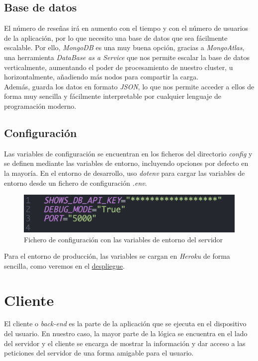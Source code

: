 \subsection{Base de datos}
El número de reseñas irá en aumento con el tiempo y con el número de usuarios de la aplicación, por lo que necesito una
base de datos que sea fácilmente escalable. Por ello, \textit{MongoDB}\cite{mongodb} es una muy buena opción, gracias a
\textit{MongoAtlas}\cite{mongoatlas}, una herramienta \textit{DataBase as a Service}\cite{dbaas} que nos permite escalar
la base de datos verticalmente, aumentando el poder de procesamiento de nuestro cluster, u horizontalmente, añadiendo
más nodos para compartir la carga.\\

Además, guarda los datos en formato \textit{JSON}\cite{json}, lo que nos permite acceder a ellos de forma muy sencilla y
fácilmente interpretable por cualquier lenguaje de programación moderno.

\subsection{Configuración}

Las variables de configuración se encuentran en los ficheros del directorio \textit{config} y se definen mediante las
variables de entorno, incluyendo opciones por defecto en la mayoría. En el entorno de desarrollo, uso \textit{dotenv}
para cargar las variables de entorno desde un fichero de configuración \textit{.env}.\\
\begin{figure}[H]
\centering	
    \includegraphics[scale=0.525]{img/dotenv.png}
\caption{ Fichero de configuración con las variables de entorno del servidor }\label{fig:dotenv}
\end{figure}

Para el entorno de producción, las variables se cargan en \textit{Heroku}\cite{heroku} de forma sencilla, como veremos
en el \hyperref[sec:despliegue]{despliegue}.\\

\section{Cliente}
El cliente o \textit{back-end} es la parte de la aplicación que se ejecuta en el dispositivo del usuario. En nuestro
caso, la mayor parte de la lógica se encuentra en el lado del servidor y el cliente se encarga de mostrar la información
y dar acceso a las peticiones del servidor de una forma amigable para el usuario.\\

